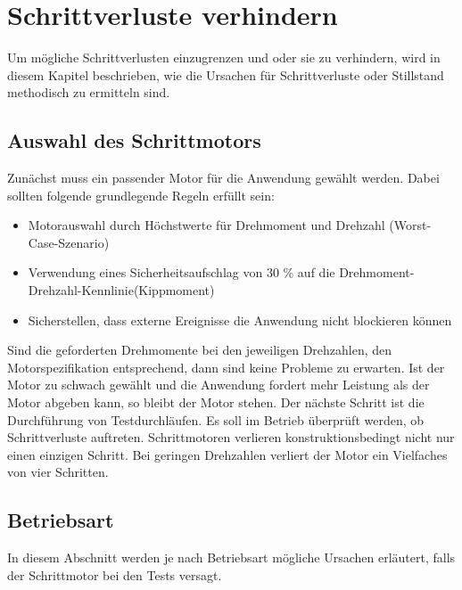 %
%
%
\chapter{Schrittverluste verhindern}
Um mögliche Schrittverlusten einzugrenzen und oder sie zu verhindern, wird in diesem Kapitel beschrieben, wie die Ursachen für Schrittverluste oder Stillstand methodisch zu ermitteln sind. \cite{FaulhaberDriveSystems.2020}

\section{Auswahl des Schrittmotors}
Zunächst muss ein passender Motor für die Anwendung gewählt werden. Dabei sollten folgende grundlegende Regeln erfüllt sein:
\begin{itemize}
	\item Motorauswahl durch Höchstwerte für Drehmoment und Drehzahl (Worst-Case-Szenario)
	\item Verwendung eines Sicherheitsaufschlag von 30 \% auf die Drehmoment-Drehzahl-Kennlinie(Kippmoment)
	\item Sicherstellen, dass externe Ereignisse die Anwendung nicht blockieren können
\end{itemize}

Sind die geforderten Drehmomente bei den jeweiligen Drehzahlen, den Motorspezifikation entsprechend, dann sind keine Probleme zu erwarten. Ist der Motor zu schwach gewählt und die Anwendung fordert mehr Leistung als der Motor abgeben kann, so bleibt der Motor stehen. Der nächste Schritt ist die Durchführung von Testdurchläufen. Es soll im Betrieb überprüft werden, ob Schrittverluste auftreten. Schrittmotoren verlieren konstruktionsbedingt nicht nur einen einzigen Schritt. Bei geringen Drehzahlen verliert der Motor ein Vielfaches von vier Schritten.\cite{FaulhaberDriveSystems.2020}

\section{Betriebsart}

In diesem Abschnitt werden je nach Betriebsart mögliche Ursachen erläutert, falls der Schrittmotor bei den Tests versagt.

